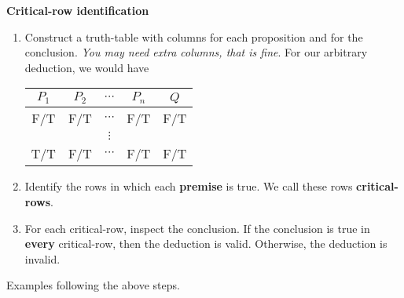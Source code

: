 \documentclass[main.tex]{subfiles}
\begin{document}
\textbf{Critical-row identification}
\begin{enumerate}
	\item Construct a truth-table with columns for each proposition and for the conclusion. \textit{You may need extra columns, that is fine}. For our arbitrary deduction, we would have
	\begin{center}
		\begin{tabular}{cccc|c}
			\(P_1\) & \(P_2\) & \(\cdots\) & \(P_n\) & \(Q\) \\
			\midrule
			F/T & F/T & \(\cdots\) & F/T & F/T \\
			&& \(\vdots\) && \\
			T/T & F/T & \(\cdots\) & F/T & F/T \\
		\end{tabular}
	\end{center}
	\item Identify the rows in which each \textbf{premise} is true. We call these rows \textbf{critical-rows}.
	\item For each critical-row, inspect the conclusion. If the conclusion is true in \textbf{every} critical-row, then the deduction is valid. Otherwise, the deduction is invalid.
\end{enumerate}

Examples following the above steps.
\end{document}
